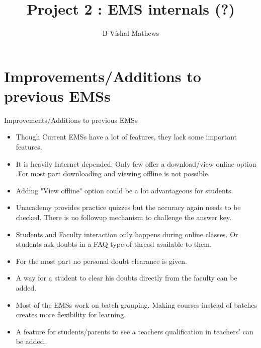 \documentclass{beamer}
\begin{document}
\newcommand{\bfr}[2]{\section{#1} \begin{frame}{#1} #2 \end{frame}}

	\title{Project 2 : EMS internals (?)}
		\author{B Vishal Mathews}

	\begin{frame}
    		\titlepage 
	\end{frame}
	
	\begin{frame}
		\tableofcontents
	\end{frame}

\bfr{Improvements/Additions to previous EMSs}{

    \begin{itemize}
        \item Though Current EMSs have a lot of features, they lack some important features. 
        \item It is heavily Internet depended. Only few offer a download/view online option .For most part downloading and viewing offline is not possible. 
        \item Adding "View offline" option could be a lot advantageous for students.
        \item Unacademy provides practice quizzes but the accuracy again needs to be checked. There is no followup mechanism to challenge the answer key.
    \end{itemize}
        
}
        
\begin{frame}
        \begin{itemize}
        \item Students and Faculty interaction only happens during online classes. Or students ask doubts in a FAQ type of thread available to them.
        \item For the most part no personal doubt clearance is given. 
        \item A way for a student to clear his doubts directly from the faculty can be added.
        \item Most of the EMSs work on batch grouping. Making courses instead of batches creates more flexibility for learning.
        \item A feature for students/parents to see a teachers qualification in teachers' can be added.
        
    \end{itemize}
    
\end{frame}
\end{document}
